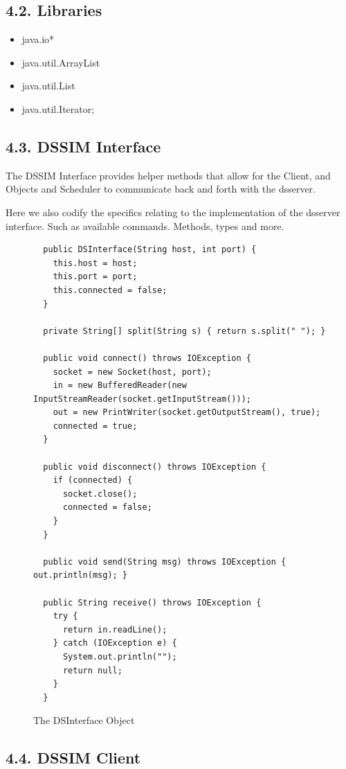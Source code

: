 \documentclass[a4paper]{article} %
\begin{document}
\subsection*{4.2. Libraries}
\begin{itemize}
    \item java.io*
    \item java.util.ArrayList
    \item java.util.List
    \item java.util.Iterator;
\end{itemize}



\subsection*{4.3. DSSIM Interface}

The DSSIM Interface provides helper methods that allow for the Client, and Objects and Scheduler to communicate back and forth with the dsserver.

Here we also codify the specifics relating to the implementation of the dsserver interface. Such as available commands. Methods, types and more.
\begin{figure}[ht!]
\begin{lstlisting}
  public DSInterface(String host, int port) {
    this.host = host;
    this.port = port;
    this.connected = false;
  }

  private String[] split(String s) { return s.split(" "); }

  public void connect() throws IOException {
    socket = new Socket(host, port);
    in = new BufferedReader(new InputStreamReader(socket.getInputStream()));
    out = new PrintWriter(socket.getOutputStream(), true);
    connected = true;
  }

  public void disconnect() throws IOException {
    if (connected) {
      socket.close();
      connected = false;
    }
  }

  public void send(String msg) throws IOException { out.println(msg); }

  public String receive() throws IOException {
    try {
      return in.readLine();
    } catch (IOException e) {
      System.out.println("");
      return null;
    }
  }
\end{lstlisting}
\caption{The DSInterface Object}
\end{figure}




\subsection*{4.4. DSSIM Client}
\end{document}
